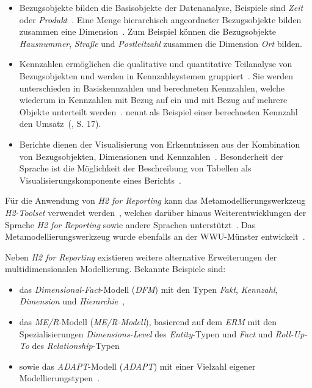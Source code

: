 \documentclass[
  language=german, %
  type=bachelor,%
  ngerman
]{isthesis}
\begin{document}
\begin{content}
\begin{itemize}
		\item Bezugsobjekte bilden die Basisobjekte der Datenanalyse, Beispiele
		sind \textit{Zeit} oder \textit{Produkt}~\cite[][S.  5]{becker2007h2}. Eine
		Menge hierarchisch angeordneter Bezugsobjekte bilden zusammen eine
		Dimension~\cite[][S.  88]{becker2012fachkonzeptionelle}. Zum Beispiel
		können die Bezugsobjekte \textit{Hausnummer}, \textit{Straße} und
		\textit{Postleitzahl} zusammen die Dimension \textit{Ort} bilden.

		\item Kennzahlen ermöglichen die qualitative und quantitative Teilanalyse
		von Bezugsobjekten und werden in Kennzahlsystemen
		gruppiert~\cite[][S.88]{becker2012fachkonzeptionelle}. Sie werden
		unterschieden in Basiskennzahlen und berechneten Kennzahlen, welche
		wiederum in Kennzahlen mit Bezug auf ein und mit Bezug auf mehrere Objekte
		unterteilt werden~\cite[][S.  15]{becker2007h2}.
		\textsc{\citeauthor{becker2007h2}} nennt als Beispiel einer berechneten
		Kennzahl den Umsatz~(\cite{becker2007h2}, S. 17).

		\item Berichte dienen der Visualisierung von Erkenntnissen aus der
		Kombination von Bezugsobjekten, Dimensionen und Kennzahlen~\cite[][S.
		23]{becker2007h2}. Besonderheit der Sprache ist die Möglichkeit der
		Beschreibung von Tabellen als Visualisierungskomponente eines
		Berichts~\cite[][S. 86]{becker2012fachkonzeptionelle}.

	\end{itemize}

	Für die Anwendung von \textit{H2 for Reporting} kann das
	Metamodellierungswerkzeug \textit{H2-Toolset} verwendet werden~\cite[][S.
	33]{fleischer2013konstruktion}, welches darüber hinaus Weiterentwicklungen
	der Sprache \textit{H2 for Reporting} sowie andere Sprachen
	unterstützt~\cite[][S. 86]{becker2012fachkonzeptionelle}. Das
	Metamodellierungswerkzeug wurde ebenfalls an der \acrshort{WWU}-Münster
	entwickelt~\cite[][S.  34]{becker2007h2}.

	Neben \textit{H2 for Reporting} existieren weitere alternative Erweiterungen
	der multidimensionalen Modellierung. Bekannte Beispiele sind:

  \begin{itemize}
    \item das \textit{Dimensional-Fact}-Modell (\textit{\acrshort{DFM}}) mit den Typen
      \textit{Fakt}, \textit{Kennzahl}, \textit{Dimension} und
      \textit{Hierarchie}~\cite[][]{golfarelli1998dimensional}, 
    \item das \textit{\acrlong{ME/R}}-Modell (\textit{\acrshort{ME/R}-Modell}), basierend
      auf dem \textit{\acrlong{ERM}} mit den Spezialisierungen
      \textit{Dimensions-Level} des \textit{Entity}-Typen und \textit{Fact} und
      \textit{Roll-Up-To} des
      \textit{Relationship}-Typen~\cite[][]{sapia1998extending}
    \item sowie das
      \textit{\acrlong{ADAPT}}-Modell (\textit{\acrshort{ADAPT}}) mit einer
      Vielzahl eigener Modellierungstypen~\cite[][]{chamoni2013analytische}.
  \end{itemize}


\end{content}
\end{document}
